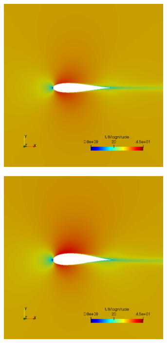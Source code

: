     
    \begin{figure}[h!]
    \centering
    \begin{subfigure}[t]{0.31\textwidth}
        \includegraphics[width=0.95\textwidth, height=0.17\textheight]{Figures/4/LDAg0i23.png}
    \end{subfigure}
    \begin{subfigure}[t]{0.31\textwidth}
        \includegraphics[width=0.95\textwidth, height=0.17\textheight]{Figures/4/LDAg0i99.png}

\end{subfigure}
\end{figure}
